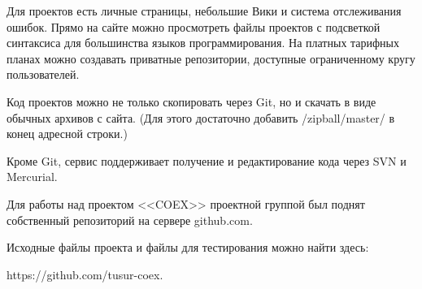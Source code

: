 Для проектов есть личные страницы, небольшие Вики и система отслеживания ошибок. Прямо на сайте можно просмотреть файлы проектов с подсветкой синтаксиса для большинства языков программирования. На платных тарифных планах можно создавать приватные репозитории, доступные ограниченному кругу пользователей.

Код проектов можно не только скопировать через Git, но и скачать в виде обычных архивов с сайта. (Для этого достаточно добавить /zipball/master/ в конец адресной строки.)

Кроме Git, сервис поддерживает получение и редактирование кода через SVN и Mercurial.

Для работы над проектом <<COEX>> проектной группой был поднят собственный репозиторий на сервере github.com.

Исходные файлы проекта и файлы для тестирования можно найти здесь:

https://github.com/tusur-coex.
